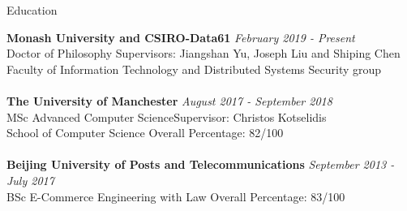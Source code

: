 \documentclass{resume} %
\begin{document}

\begin{rSection}{Education}

{\bf Monash University and CSIRO-Data61} \hfill {\em February 2019 - Present} 
\\ Doctor of Philosophy\hfill { Supervisors: Jiangshan Yu, Joseph Liu and Shiping Chen}
\\ Faculty of Information Technology and Distributed Systems Security group\\
%
\\{\bf The University of Manchester} \hfill {\em August 2017 - September 2018} 
\\ MSc Advanced Computer Science\hfill {Supervisor: Christos Kotselidis}
\\ School of Computer Science\hfill { Overall Percentage: 82/100 }\\
%
\\{\bf Beijing University of Posts and Telecommunications} \hfill {\em September 2013 - July 2017} 
\\ BSc E-Commerce Engineering with Law\hfill { Overall Percentage: 83/100 }


\end{rSection}
\end{document}
